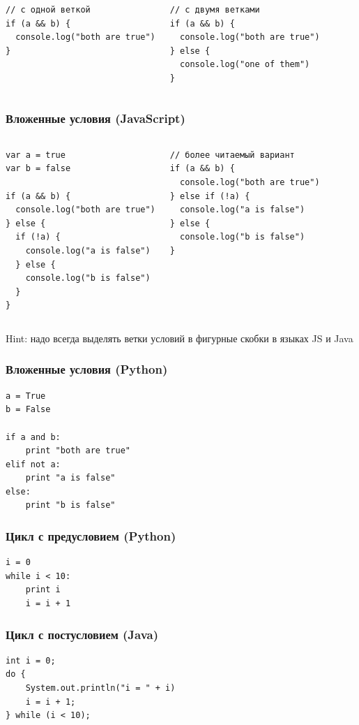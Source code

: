 {\begin{frame}[fragile]
\begin{columns}
\begin{verbatim}
// с одной веткой
if (a && b) {
  console.log("both are true")
}
    \end{verbatim}
    \begin{verbatim}
// с двумя ветками
if (a && b) {
  console.log("both are true")
} else {
  console.log("one of them")
}
    \end{verbatim}
  \end{columns}
\end{frame}

\begin{frame}[fragile]
\frametitle{Вложенные условия (JavaScript)}
\begin{columns}
    \begin{verbatim}
var a = true
var b = false

if (a && b) {
  console.log("both are true")
} else {
  if (!a) {
    console.log("a is false")
  } else {
    console.log("b is false")
  }
}
    \end{verbatim}
    \begin{verbatim}
// более читаемый вариант
if (a && b) {
  console.log("both are true")
} else if (!a) {
  console.log("a is false")
} else {
  console.log("b is false")
}
    \end{verbatim}
  \end{columns}
  Hint: надо всегда выделять ветки условий в фигурные скобки в языках JS и Java
\end{frame}

\begin{frame}[fragile]
\frametitle{Вложенные условия (Python)}
  \begin{verbatim}
a = True
b = False

if a and b:
    print "both are true"
elif not a:
    print "a is false"
else:
    print "b is false"
  \end{verbatim}
\end{frame}

\begin{frame}[fragile]
\frametitle{Цикл с предусловием (Python)}
  \begin{verbatim}
i = 0
while i < 10:
    print i
    i = i + 1
  \end{verbatim}
\end{frame}

\begin{frame}[fragile]
  \frametitle{Цикл с постусловием (Java)}
  \begin{verbatim}
int i = 0;
do {
    System.out.println("i = " + i)
    i = i + 1;
} while (i < 10);
  \end{verbatim}
\end{frame}

}
